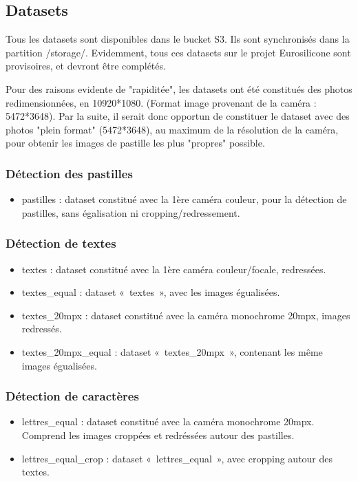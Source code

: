 \subsection{Datasets}
Tous les datasets sont disponibles dans le bucket S3.
Ils sont synchronisés dans la partition /storage/.
Evidemment, tous ces datasets sur le projet Eurosilicone sont provisoires, et devront être complétés.

Pour des raisons evidente de "rapiditée", les datasets ont été constitués des photos redimensionnées, en 10920*1080. (Format image provenant de la caméra : 5472*3648).
Par la suite, il serait donc opportun de constituer le dataset avec des photos "plein format" (5472*3648), au maximum de la résolution de la caméra, pour obtenir les images de pastille les plus "propres" possible.

\subsubsection{Détection des pastilles}
\begin{itemize}
    \item pastilles : dataset constitué avec la 1ère caméra couleur, pour la détection de pastilles, sans égalisation ni cropping/redressement.
\end{itemize}

\subsubsection{Détection de textes}
\begin{itemize}
    \item textes : dataset constitué avec la 1ère caméra couleur/focale, redressées.
    \item textes_equal : dataset « textes », avec les images égualisées.
    \item textes_20mpx : dataset constitué avec la caméra monochrome 20mpx, images redressés.
    \item textes_20mpx_equal : dataset « textes_20mpx », contenant les même images égualisées.
\end{itemize}

\subsubsection{Détection de caractères}
\begin{itemize}
    \item lettres_equal : dataset constitué avec la caméra monochrome 20mpx. Comprend les images croppées et redréssées autour des pastilles.
    \item lettres_equal_crop : dataset « lettres_equal », avec cropping autour des textes.
\end{itemize}


